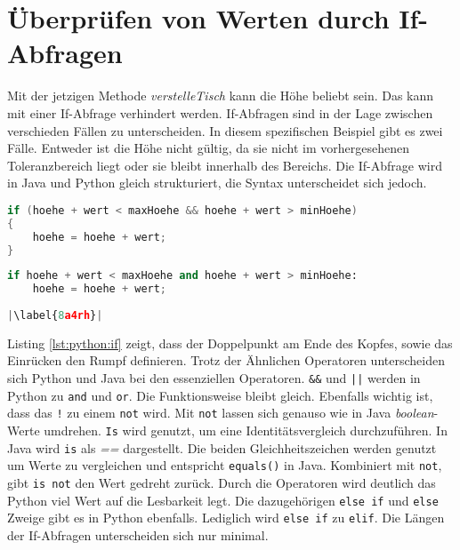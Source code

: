 \section{Überprüfen von Werten durch If-Abfragen}
Mit der jetzigen Methode \textit{verstelleTisch} kann die Höhe beliebt sein. Das kann mit einer If-Abfrage verhindert werden. If-Abfragen sind in der Lage zwischen verschieden Fällen zu unterscheiden. In diesem spezifischen Beispiel gibt es zwei Fälle. Entweder ist die Höhe nicht gültig, da sie nicht im vorhergesehenen Toleranzbereich liegt oder sie bleibt innerhalb des Bereichs. Die If-Abfrage wird in Java und Python gleich strukturiert, die Syntax unterscheidet sich jedoch. \cite{Louis:2010}\cite{Python3:Buch}

\begin{minipage}{.5\linewidth}
\begin{lstlisting}[language=java,caption={If-Abfrage in Java},captionpos=b,label={lst:java:if},frame=none]
if (hoehe + wert < maxHoehe && hoehe + wert > minHoehe)
{
    hoehe = hoehe + wert;
}
\end{lstlisting}
\end{minipage}
\begin{minipage}{.5\linewidth}
\begin{lstlisting}[language=python,caption={If-Abfrage in Python},captionpos=b,label={lst:python:if},frame=l,escapechar=|]
if hoehe + wert < maxHoehe and hoehe + wert > minHoehe:
    hoehe = hoehe + wert;
    
|\label{8a4rh}|
\end{lstlisting}
\end{minipage}

Listing \ref{lst:python:if} zeigt, dass der Doppelpunkt am Ende des Kopfes, sowie das Einrücken den Rumpf definieren.
Trotz der Ähnlichen Operatoren unterscheiden sich Python und Java bei den essenziellen Operatoren. \texttt{\&\&} und \texttt{||} werden in Python zu \texttt{and} und \texttt{or}. Die Funktionsweise bleibt gleich. Ebenfalls wichtig ist, dass das \texttt{!} zu einem \texttt{not} wird. Mit \texttt{not} lassen sich genauso wie in Java \textit{boolean}-Werte umdrehen. \texttt{Is} wird genutzt, um eine Identitätsvergleich durchzuführen. In Java wird \texttt{is} als \textit{==} dargestellt. Die beiden Gleichheitszeichen werden genutzt um Werte zu vergleichen und entspricht \texttt{equals()} in Java. Kombiniert mit \texttt{not}, gibt \texttt{is not} den Wert gedreht zurück. Durch die Operatoren wird deutlich das Python viel Wert auf die Lesbarkeit legt.
Die dazugehörigen \texttt{else if} und \texttt{else} Zweige gibt es in Python ebenfalls. Lediglich wird \texttt{else if} zu \texttt{elif}.  Die Längen der If-Abfragen unterscheiden sich nur minimal. \cite{Louis:2010}\cite{Python3:Buch}\par

